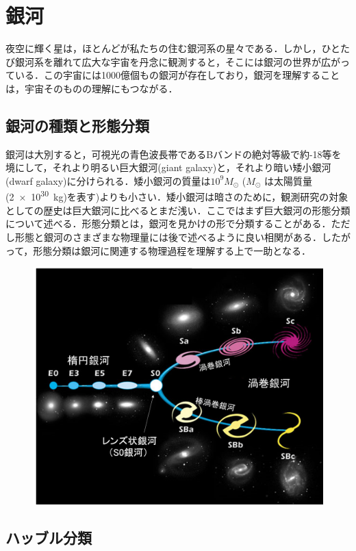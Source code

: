 \section{銀河}

夜空に輝く星は，ほとんどが私たちの住む銀河系の星々である．しかし，ひとたび銀河系を離れて広大な宇宙を丹念に観測すると，そこには銀河の世界が広がっている．この宇宙には1000億個もの銀河が存在しており，銀河を理解することは，宇宙そのものの理解にもつながる．

\subsection{銀河の種類と形態分類}

銀河は大別すると，可視光の青色波長帯であるBバンドの絶対等級で約-18等を境にして，それより明るい巨大銀河(giant galaxy)と，それより暗い矮小銀河(dwarf galaxy)に分けられる．矮小銀河の質量は$10^9 M_\odot$ ($M_\odot$ は太陽質量(\SI{2e+30}{kg})を表す)よりも小さい．矮小銀河は暗さのために，観測研究の対象としての歴史は巨大銀河に比べるとまだ浅い．ここではまず巨大銀河の形態分類について述べる．形態分類とは，銀河を見かけの形で分類することがある．ただし形態と銀河のさまざまな物理量には後で述べるように良い相関がある．したがって，形態分類は銀河に関連する物理過程を理解する上で一助となる．

\begin{figure}[htbp]
	\centering
	\includegraphics[width=0.7\linewidth]{pic/tuning-fork_diagram-2-2-1}
	\caption{}
	\label{fig:tuning-forkdiagram-2-2-1}
\end{figure}

\subsection{ハッブル分類}

